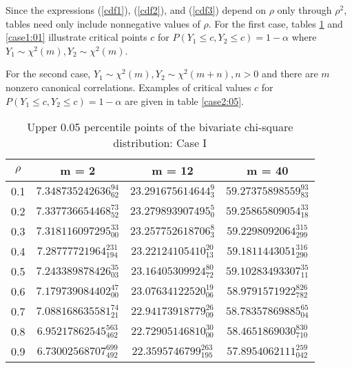Since the expressions (\ref{cdf1}), (\ref{cdf2}), and (\ref{cdf3})
depend on $\rho$ only through
$\rho^2$, tables need only include nonnegative values of $\rho$.
For the first case, 
tables \ref{case1:05} and \ref{case1:01} illustrate critical points
$c$ for $P(Y_1 \leq c, Y_2 \leq c) = 1- \alpha$ where $Y_1 \sim \chi^2(m), 
Y_2 \sim \chi^2(m)$.  

For the second case, $Y_1 \sim \chi^2(m), Y_2 \sim \chi^2(m+n), n > 0$ and
there are $m$ nonzero canonical correlations.
Examples of critical values $c$ for $P(Y_1 \leq c, Y_2 \leq c) = 1- \alpha$
are given in table \ref{case2:05}.

\renewcommand{\arraystretch}{1.35}
\newdimen\captionwidth \captionwidth=4.5in
\begin{table}[ht!]
\caption{Upper 0.05 percentile points of the bivariate chi-square distribution:
Case I}
\label{case1:05}
\begin{center}
\begin{tabular}{c|c|c|c} 
$\rho$ & m = 2 & m = 12 & m = 40 \\ \hline
0.1  & $ 7.348735242636_{62}^{94} $ & $ 23.291675614644_3^9 $       & $ 59.27375898559_{83}^{93} $ \\
0.2  & $ 7.337736654468_{52}^{73} $ & $ 23.279893907495_0^5  $      & $ 59.25865809054_{18}^{33}$ \\
0.3  & $ 7.318116097295_{00}^{33} $ & $ 23.257752618706_3^8 $       & $ 59.2298092064_{299}^{315}$ \\
0.4  & $ 7.28777721964_{194}^{231} $ & $ 23.22124105410_{13}^{20}  $ & $ 59.1811443051_{290}^{316} $ \\
0.5  & $ 7.243389878426_{03}^{35} $ & $ 23.16405309924_{72}^{80}  $ & $ 59.10283493307_{11}^{35} $ \\
0.6  & $ 7.179739084402_{00}^{47} $ & $ 23.07634122520_{06}^{19}  $ & $ 58.9791571922_{782}^{826} $ \\
0.7  & $ 7.088168635581_{21}^{74} $ & $ 22.94173918779_{09}^{26}  $ & $ 58.78357869885_{04}^{65} $ \\
0.8  & $ 6.95217862545_{462}^{563} $ & $ 22.72905146810_{00}^{30}  $ & $ 58.4651869030_{710}^{830} $ \\
0.9  & $ 6.73002568707_{492}^{699} $ & $ 22.3595746799_{195}^{263}        $ & $ 57.8954062111_{042}^{259} $ \\
\end{tabular}
\end{center}
\end{table}

